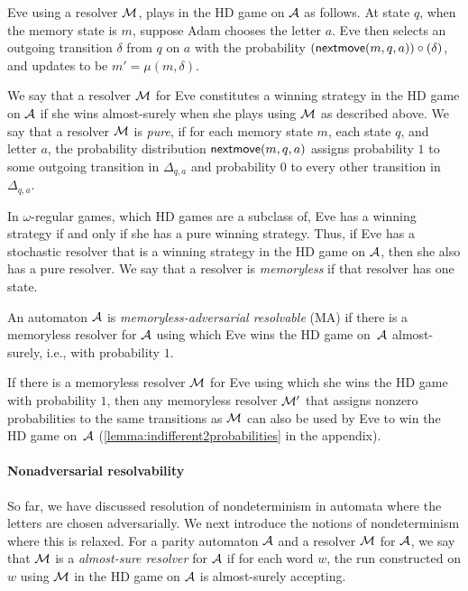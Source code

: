Eve using a resolver $\mathcal{M}$, plays in the HD game on $\mathcal{A}$ as follows. At state $q$, when the memory state is $m$, suppose Adam chooses the letter $a$. Eve then selects an outgoing transition $\delta$ from $q$ on $a$ with the probability $({\mathsf{nextmove}}(m,q,a)) \circ (\delta)$, and updates  to be $m'=\mu(m,\delta)$. 

We say that a resolver $\mathcal{M}$ for Eve constitutes a winning strategy in the HD game on $\mathcal{A}$ if she wins almost-surely when she plays using $\mathcal{M}$ as described above. We say that a resolver $\mathcal{M}$ is \emph{pure}, if for each memory state $m$, each state $q$, and letter $a$, the probability distribution ${\mathsf{nextmove}}(m,q,a)$ assigns probability $1$ to some outgoing transition in $\Delta_{q,a}$ and probability 0 to every other transition in $\Delta_{q,a}$. 

In $\omega$-regular games, which HD games are a subclass of, Eve has a winning strategy if and only if she has a pure winning strategy. Thus, if Eve has a stochastic resolver that is a winning strategy in the HD game on $\mathcal{A}$, then she also has a pure resolver. 
We say that a resolver is \emph{memoryless} if that resolver has one state. 

\begin{tcolorbox}
    An automaton $\mathcal{A}$ is \emph{memoryless-adversarial resolvable} (MA)  if there is a memoryless resolver for $\mathcal{A}$ using which Eve wins the HD game on~$\mathcal{A}$ almost-surely, i.e., with probability $1$.
\end{tcolorbox}


If there is a memoryless resolver $\mathcal{M}$ for Eve using which she wins the HD game with probability $1$, then any memoryless resolver $\mathcal{M}'$ that assigns nonzero probabilities to the same transitions as $\mathcal{M}$ can also be used by Eve to win the HD game on~$\mathcal{A}$ (\cref{lemma:indifferent2probabilities} in the appendix).

\paragraph*{Nonadversarial resolvability}
So far, we have discussed resolution of nondeterminism in automata where the letters are chosen adversarially. We next introduce the notions of nondeterminism where this is relaxed. For a parity automaton $\mathcal{A}$ and a resolver $\mathcal{M}$ for $\mathcal{A}$, we say that $\mathcal{M}$ is a \emph{almost-sure resolver} 
for $\mathcal{A}$ if for each word $w$, the run constructed on $w$ using $\mathcal{M}$ in the HD game on $\mathcal{A}$ is almost-surely accepting. 

